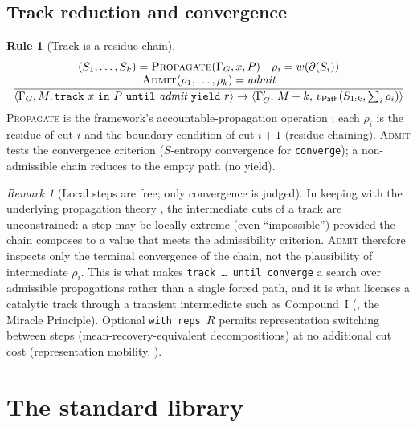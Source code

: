 \documentclass[11pt,a4paper]{article}
\theoremstyle{thmstyle}
\theoremstyle{definition}
\newtheorem{rulename}[theorem]{Rule}
\theoremstyle{remark}
\newtheorem{remark}[theorem]{Remark}
\newcommand{\res}{\rho}
\newcommand{\cut}{\partial}
\newcommand{\shk}[1]{\texttt{#1}}
\begin{document}
\subsection{Track reduction and convergence}

\begin{rulename}[Track is a residue chain]
\label{rule:track-step}
\[
\frac{\begin{array}{c}
       (S_1,\dots,S_k)=\textsc{Propagate}(\Gamma_G,x,P)\quad
       \res_i=w(\cut(S_i))\\
       \textsc{Admit}(\res_1,\dots,\res_k)=\textit{admit}
      \end{array}}
     {\langle\Gamma_G,M,\shk{track}\ x\ \shk{in}\ P\ \shk{until}\
        \textit{admit}\ \shk{yield}\ r\rangle
      \to \langle\Gamma_G',\,M+k,\,
      v_{\mathsf{Path}}(S_{1:k},\textstyle\sum_i\res_i)\rangle}
\]
\textsc{Propagate} is the framework's accountable-propagation operation
\citep{sachikonye2025causal}; each $\res_i$ is the residue of cut $i$ and
the boundary condition of cut $i{+}1$ (residue chaining). \textsc{Admit}
tests the convergence criterion ($S$-entropy convergence for
\shk{converge}); a non-admissible chain reduces to the empty path (no
yield).
\end{rulename}

\begin{remark}[Local steps are free; only convergence is judged]
\label{rem:local-free}
In keeping with the underlying propagation theory
\citep{sachikonye2025causal}, the intermediate cuts of a track are
unconstrained: a step may be locally extreme (even ``impossible'')
provided the chain composes to a value that meets the admissibility
criterion. \textsc{Admit} therefore inspects only the terminal convergence
of the chain, not the plausibility of intermediate $\res_i$. This is what
makes \shk{track\,\ldots\,until\,converge} a search over admissible
propagations rather than a single forced path, and it is what licenses a
catalytic track through a transient intermediate such as Compound~I
(\Cref{sec:stdlib-catalyze}, the Miracle Principle). Optional
\shk{with\ reps\ }$R$ permits representation switching between steps
(mean-recovery-equivalent decompositions) at no additional cut cost
(representation mobility, \citealt{sachikonye2025causal}).
\end{remark}

\section{The standard library}
\label{sec:stdlib}
\end{document}
